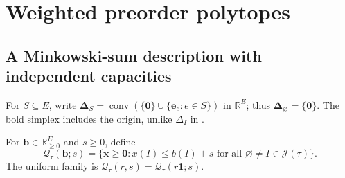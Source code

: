 \documentclass[11pt,letterpaper]{article}
\theoremstyle{definition}
\newcommand{\R}{\mathbb R}
\newcommand{\one}{\mathbf 1}
\newcommand{\zero}{\mathbf 0}
\newcommand{\bvec}{\mathbf b}
\newcommand{\xvec}{\mathbf x}
\newcommand{\JJ}{\mathcal J}
\newcommand{\QQ}{\mathcal Q}
\newcommand{\ds}{\boldsymbol\Delta}
\DeclareMathOperator{\conv}{conv}
\begin{document}
\section{Weighted preorder polytopes}\label{sec:weighted}

\subsection{A Minkowski-sum description with independent capacities}
For $S\subseteq E$, write
$\ds_S=\conv(\{\zero\}\cup\{\mathbf e_e:e\in S\})$ in $\R^E$;
thus $\ds_\varnothing=\{\zero\}$. The bold simplex includes the origin,
unlike $\Delta_I$ in .

For $\bvec\in\R_{\geq0}^E$ and $s\geq0$, define
\begin{equation}\label{eq:weighted-def}
 \QQ_\tau(\bvec;s)=
 \{\xvec\geq\zero:x(I)\leq b(I)+s
                    \text{ for all }\varnothing\ne I\in\JJ(\tau)\}.
\end{equation}
The uniform family is $\QQ_\tau(r,s)=\QQ_\tau(r\one;s)$.
\end{document}
